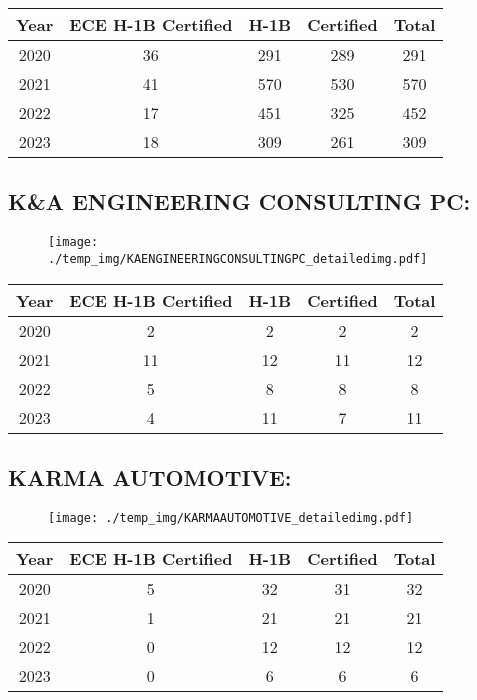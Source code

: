 \documentclass{article}%
\begin{document}
%
\begin{longtable}{c|c|c|c|c}%
\hline%
Year&ECE H{-}1B Certified&H{-}1B&Certified&Total\\%
\hline%
2020&36&291&289&291\\%
\hline%
2021&41&570&530&570\\%
\hline%
2022&17&451&325&452\\%
\hline%
2023&18&309&261&309\\%
\hline%
\end{longtable}

%
\newpage%
\subsection{K\&A ENGINEERING CONSULTING PC:}%
\label{subsec:KAENGINEERINGCONSULTINGPC}%
\label{KAENGINEERINGCONSULTINGPCdetailed}%


\begin{figure}[htbp]%
\centering%
\texttt{[image: ./temp\_img/KAENGINEERINGCONSULTINGPC\_detailedimg.pdf]}%
\end{figure}

%
\begin{longtable}{c|c|c|c|c}%
\hline%
Year&ECE H{-}1B Certified&H{-}1B&Certified&Total\\%
\hline%
2020&2&2&2&2\\%
\hline%
2021&11&12&11&12\\%
\hline%
2022&5&8&8&8\\%
\hline%
2023&4&11&7&11\\%
\hline%
\end{longtable}

%
\newpage%
\subsection{KARMA AUTOMOTIVE:}%
\label{subsec:KARMAAUTOMOTIVE}%
\label{KARMAAUTOMOTIVEdetailed}%


\begin{figure}[htbp]%
\centering%
\texttt{[image: ./temp\_img/KARMAAUTOMOTIVE\_detailedimg.pdf]}%
\end{figure}

%
\begin{longtable}{c|c|c|c|c}%
\hline%
Year&ECE H{-}1B Certified&H{-}1B&Certified&Total\\%
\hline%
2020&5&32&31&32\\%
\hline%
2021&1&21&21&21\\%
\hline%
2022&0&12&12&12\\%
\hline%
2023&0&6&6&6\\%
\hline%
\end{longtable}
\end{document}
